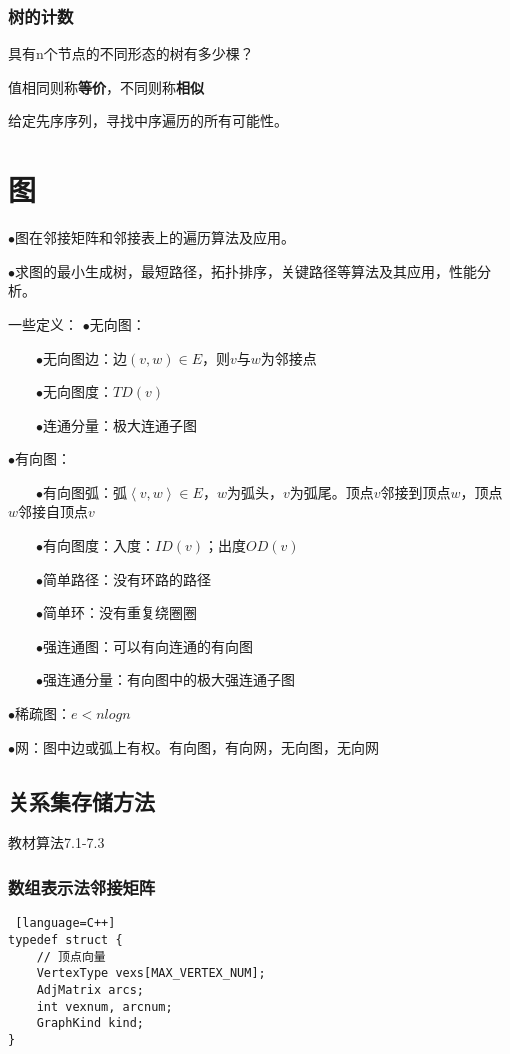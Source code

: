 \documentclass[UTF8]{article}
\begin{document}
\subsubsection{树的计数}
具有n个节点的不同形态的树有多少棵？\par
值相同则称\textbf{等价}，不同则称\textbf{相似}\par
给定先序序列，寻找中序遍历的所有可能性。\par


\section{图}
$\bullet$图在邻接矩阵和邻接表上的遍历算法及应用。\par
$\bullet$求图的最小生成树，最短路径，拓扑排序，关键路径等算法及其应用，性能分析。\par
一些定义：
$\bullet$无向图：\par
$\qquad$$\bullet$无向图边：边$(v,w)\in E$，则$v$与$w$为邻接点\par
$\qquad$$\bullet$无向图度：$TD(v)$\par
$\qquad$$\bullet$连通分量：极大连通子图\par

$\bullet$有向图：\par
$\qquad$$\bullet$有向图弧：弧$\left< v,w\right>\in E$，$w$为弧头，$v$为弧尾。顶点$v$邻接到顶点$w$，顶点$w$邻接自顶点$v$\par
$\qquad$$\bullet$有向图度：入度：$ID(v)$；出度$OD(v)$\par
$\qquad$$\bullet$简单路径：没有环路的路径\par
$\qquad$$\bullet$简单环：没有重复绕圈圈\par
$\qquad$$\bullet$强连通图：可以有向连通的有向图\par
$\qquad$$\bullet$强连通分量：有向图中的极大强连通子图\par

$\bullet$稀疏图：$e<nlogn$\par
$\bullet$网：图中边或弧上有权。有向图，有向网，无向图，无向网\par
\subsection{关系集存储方法}
教材算法7.1-7.3
\subsubsection{数组表示法邻接矩阵}
\begin{lstlisting} [language=C++]
typedef struct {
	// 顶点向量
	VertexType vexs[MAX_VERTEX_NUM];
	AdjMatrix arcs;
	int vexnum, arcnum;
	GraphKind kind;
}
\end{lstlisting}
\end{document}
